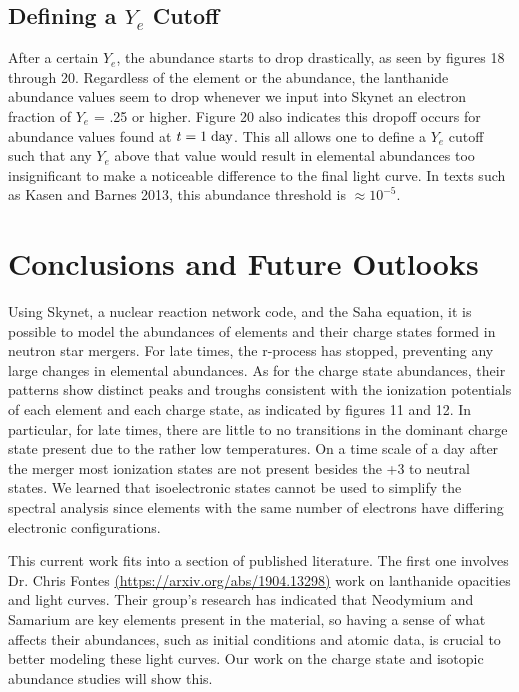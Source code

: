 \documentclass[11pt,a4paper]{article}
\begin{document}
\pagebreak 

\subsection{Defining a $Y_e$ Cutoff}

After a certain $Y_e$, the abundance starts to drop drastically, as seen by figures 18 through 20. Regardless of the element or the abundance, the lanthanide abundance values seem to drop whenever we input into Skynet an electron fraction of $Y_e$ = .25 or higher. Figure 20 also indicates this dropoff occurs for abundance values found at $t = \mathrm{1 \hspace{1 mm} day}$. This all allows one to define a $Y_e$ cutoff such that any $Y_e$ above that value would result in elemental abundances too insignificant to make a noticeable difference to the final light curve. In texts such as Kasen and Barnes 2013, this abundance threshold is $\approx 10^{-5}$.  


\section{Conclusions and Future Outlooks}

\hspace{8mm} Using Skynet, a nuclear reaction network code, and the Saha equation, it is possible to model the abundances of elements and their charge states formed in neutron star mergers. For late times, the r-process has stopped, preventing any large changes in elemental abundances. As for the charge state abundances, their patterns show distinct peaks and troughs consistent with the ionization potentials of each element and each charge state, as indicated by figures 11 and 12. 
In particular, for late times, there are little to no transitions in the dominant charge state present due to the rather low temperatures. On a time scale of a day after the merger most ionization states are not present besides the +3 to neutral states. 
We learned that isoelectronic states cannot be used to simplify the spectral analysis since elements with the same number of electrons have differing electronic configurations. 

This current work fits into a section of published literature. The first one involves Dr. Chris Fontes \url{(https://arxiv.org/abs/1904.13298)} work on lanthanide opacities and light curves. Their group’s research has indicated that Neodymium and Samarium are key elements present in the material, so having a sense of what affects their abundances, such as initial conditions and atomic data, is crucial to better modeling these light curves. Our work on the charge state and isotopic abundance studies will show this.
\end{document}
